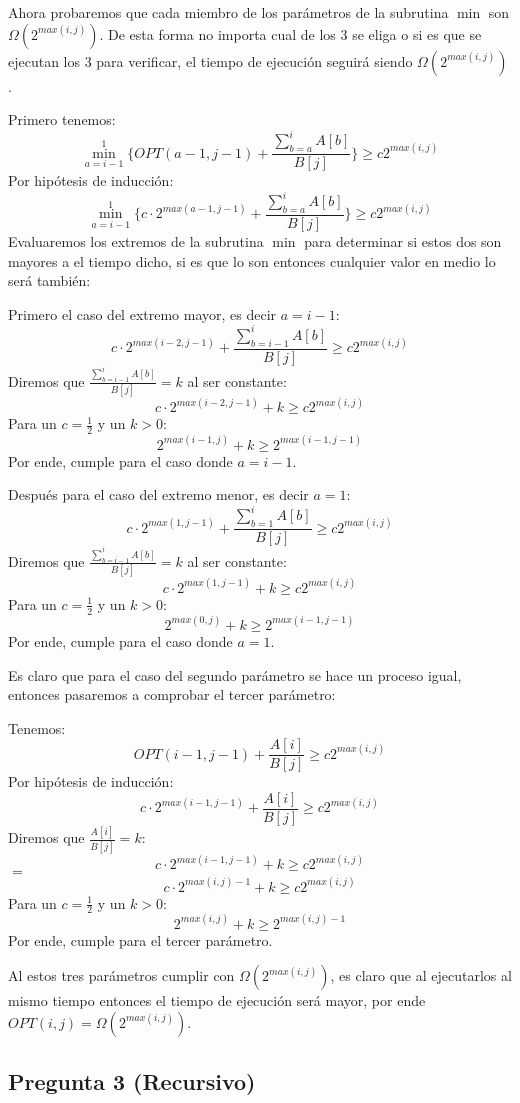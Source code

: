 \documentclass[12pt]{article}
\begin{document}
Ahora probaremos que cada miembro de los parámetros de la subrutina $\min$ son $\Omega(2^{max(i,j)})$. De esta forma no importa cual de los 3 se eliga o si es que se ejecutan los 3 para verificar, el tiempo de ejecución seguirá siendo $\Omega(2^{max(i,j)})$.

Primero tenemos:
$$\min_{a=i-1}^{1} \{OPT(a-1,j-1) + \frac{\sum_{b=a}^{i} A[b]}{B[j]}\} \geq c2^{max(i,j)}$$
Por hipótesis de inducción:
$$ \min_{a=i-1}^{1} \{ c \cdot 2^{max(a-1,j-1)} + \frac{\sum_{b=a}^{i} A[b]}{B[j]} \} \geq c2^{max(i,j)}$$
Evaluaremos los extremos de la subrutina $\min$ para determinar si estos dos son mayores a el tiempo dicho, si es que lo son entonces cualquier valor en medio lo será también:

Primero el caso del extremo mayor, es decir $a=i-1$:
$$c \cdot 2^{max(i-2,j-1)} + \frac{\sum_{b=i-1}^{i} A[b]}{B[j]} \geq c2^{max(i,j)}$$
Diremos que $\frac{\sum_{b=i-1}^{i} A[b]}{B[j]} = k$ al ser constante:
$$c \cdot 2^{max(i-2,j-1)} + k \geq c2^{max(i,j)}$$
Para un $c=\frac{1}{2}$ y un $k>0$:
$$2^{max(i-1,j)} + k \geq 2^{max(i-1,j-1)}$$
Por ende, cumple para el caso donde $a=i-1$.

Después para el caso del extremo menor, es decir $a=1$:
$$c \cdot 2^{max(1,j-1)} + \frac{\sum_{b=1}^{i} A[b]}{B[j]} \geq c2^{max(i,j)}$$
Diremos que $\frac{\sum_{b=i-1}^{i} A[b]}{B[j]} = k$ al ser constante:
$$c \cdot 2^{max(1,j-1)} + k \geq c2^{max(i,j)}$$
Para un $c=\frac{1}{2}$ y un $k>0$:
$$2^{max(0,j)} + k \geq 2^{max(i-1,j-1)}$$
Por ende, cumple para el caso donde $a=1$.

Es claro que para el caso del segundo parámetro se hace un proceso igual, entonces pasaremos a comprobar el tercer parámetro:

Tenemos:
$$OPT(i-1,j-1) + \frac{A[i]}{B[j]} \geq c2^{max(i,j)}$$
Por hipótesis de inducción:
$$c \cdot 2^{max(i-1,j-1)} + \frac{A[i]}{B[j]} \geq c2^{max(i,j)}$$
Diremos que $\frac{A[i]}{B[j]} = k$:
$$c \cdot 2^{max(i-1,j-1)} + k \geq c2^{max(i,j)}$$
$=$
$$c \cdot 2^{max(i,j)-1} + k \geq c2^{max(i,j)}$$
Para un $c=\frac{1}{2}$ y un $k>0$:
$$2^{max(i,j)} + k \geq 2^{max(i,j)-1}$$
Por ende, cumple para el tercer parámetro.

Al estos tres parámetros cumplir con $\Omega(2^{max(i,j)})$, es claro que al ejecutarlos al mismo tiempo entonces el tiempo de ejecución será mayor, por ende $OPT(i,j) = \Omega(2^{max(i,j)})$.

\newpage
\subsection*{Pregunta 3 (Recursivo)}
\end{document}
